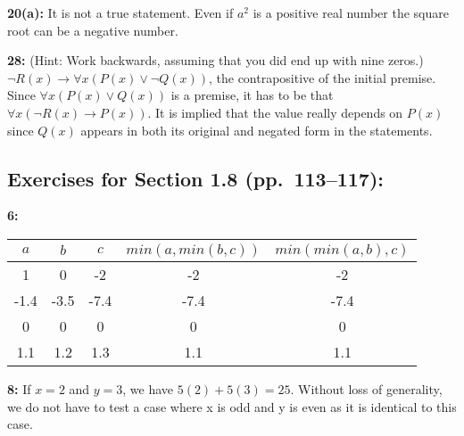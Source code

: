 \documentclass[12pt]{article}  %
\newcommand{\NOT}{\neg}
\newcommand{\OR}{\vee}
\newcommand{\IMPLIES}{\rightarrow}
\begin{document}
\noindent
{\bf 20(a):}
It is not a true statement. Even if $a^{2}$ is a positive real number the square root
can be a negative number.

\noindent
{\bf 28:}
(Hint:  Work backwards, assuming that you did end up with nine zeros.)
\\
$\NOT R(x) \IMPLIES \forall x(P(x) \OR \NOT Q(x))$, the contrapositive of the initial premise.\\
Since $\forall x(P(x) \OR Q(x))$ is a premise, it has to be that $\forall x (\NOT R(x) \IMPLIES P(x))$. It is implied that the 
value really depends on $P(x)$ since $Q(x)$ appears in both its original and negated form in the statements.



\subsection*{Exercises for Section 1.8 (pp.\ 113--117):}     

\noindent
{\bf 6:} 
\begin{center}
      \begin{tabular}{|c|c|c|c|c|}  %
      \hline                  %
      $a$ & $b$ & $c$ & $min(a, min(b, c))$ & $min(min(a, b), c)$\\       %
      \hline
      \hline
      1 & 0 & -2 & -2 & -2 \\
      \hline
      -1.4 & -3.5 & -7.4 & -7.4 & -7.4 \\
      \hline
      0 & 0 & 0 & 0 & 0 \\
      \hline
      1.1 & 1.2 & 1.3 & 1.1 & 1.1 \\
      \hline
      \end{tabular}
      \end{center}

\noindent
{\bf 8:}
If $x = 2$ and $y = 3$, we have $5(2) + 5(3) = 25$. Without loss of generality, we do 
not have to test a case where x is odd and y is even as it is identical to this case.
\end{document}

